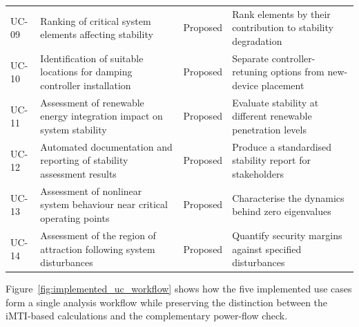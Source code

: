\begin{table}[H]
{\begin{tabular}{lp{}lp{}}
    UC-09       & Ranking of critical system elements affecting stability & Proposed        & Rank elements by their contribution to stability degradation                           \\
    UC-10       & Identification of suitable locations for damping controller installation & Proposed        & Separate controller-retuning options from new-device placement                          \\
    UC-11       & Assessment of renewable energy integration impact on system stability & Proposed        & Evaluate stability at different renewable penetration levels                           \\
    UC-12       & Automated documentation and reporting of stability assessment results & Proposed        & Produce a standardised stability report for stakeholders                               \\
    UC-13       & Assessment of nonlinear system behaviour near critical operating points & Proposed        & Characterise the dynamics behind zero eigenvalues                                      \\
    UC-14       & Assessment of the region of attraction following system disturbances & Proposed        & Quantify security margins against specified disturbances                               \\
    \bottomrule
  \end{tabular}}
\end{table}

Figure~\ref{fig:implemented_uc_workflow} shows how the five implemented use cases form a single analysis workflow while preserving the distinction between the iMTI-based calculations and the complementary power-flow check.

